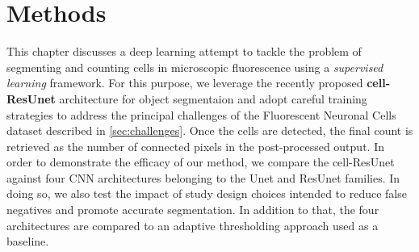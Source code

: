 \chapter{Methods}
\label{chap:partI_methods}

This chapter discusses a deep learning attempt to tackle the problem of segmenting and counting cells in microscopic fluorescence using a \textit{supervised learning} framework. 
For this purpose, we leverage the recently proposed \textbf{cell-ResUnet} architecture \cite{morelli2021cresunet} for object segmentaion and adopt careful training strategies to address the principal challenges of the Fluorescent Neuronal  Cells dataset \cite{clissa2021fluocells} described in \cref{sec:challenges}.
Once the cells are detected, the final count is retrieved as the number of connected pixels in the post-processed output.
In order to demonstrate the efficacy of our method, we compare the cell-ResUnet against four CNN architectures belonging to the Unet and ResUnet families. 
In doing so, we also test the impact of study design choices intended to reduce false negatives and promote accurate segmentation.
In addition to that, the four architectures are compared to an adaptive thresholding approach used as a baseline. 





